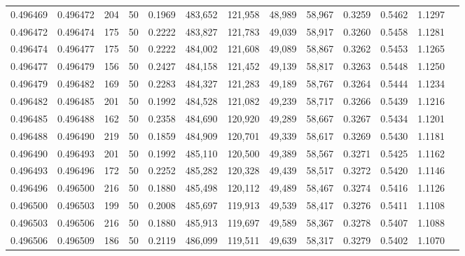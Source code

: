 \begin{tabular}{rrrrrrrrrrrrr}
0.496469 & 0.496472 &   204 &  50 &                                     0.1969 & 483,652 & 121,958 &  48,989 &  58,967 & 0.3259 & 0.5462 & 1.1297 \\
0.496472 & 0.496474 &   175 &  50 &                                     0.2222 & 483,827 & 121,783 &  49,039 &  58,917 & 0.3260 & 0.5458 & 1.1281 \\
0.496474 & 0.496477 &   175 &  50 &                                     0.2222 & 484,002 & 121,608 &  49,089 &  58,867 & 0.3262 & 0.5453 & 1.1265 \\
0.496477 & 0.496479 &   156 &  50 &                                     0.2427 & 484,158 & 121,452 &  49,139 &  58,817 & 0.3263 & 0.5448 & 1.1250 \\
0.496479 & 0.496482 &   169 &  50 &                                     0.2283 & 484,327 & 121,283 &  49,189 &  58,767 & 0.3264 & 0.5444 & 1.1234 \\
0.496482 & 0.496485 &   201 &  50 &                                     0.1992 & 484,528 & 121,082 &  49,239 &  58,717 & 0.3266 & 0.5439 & 1.1216 \\
0.496485 & 0.496488 &   162 &  50 &                                     0.2358 & 484,690 & 120,920 &  49,289 &  58,667 & 0.3267 & 0.5434 & 1.1201 \\
0.496488 & 0.496490 &   219 &  50 &                                     0.1859 & 484,909 & 120,701 &  49,339 &  58,617 & 0.3269 & 0.5430 & 1.1181 \\
0.496490 & 0.496493 &   201 &  50 &                                     0.1992 & 485,110 & 120,500 &  49,389 &  58,567 & 0.3271 & 0.5425 & 1.1162 \\
0.496493 & 0.496496 &   172 &  50 &                                     0.2252 & 485,282 & 120,328 &  49,439 &  58,517 & 0.3272 & 0.5420 & 1.1146 \\
0.496496 & 0.496500 &   216 &  50 &                                     0.1880 & 485,498 & 120,112 &  49,489 &  58,467 & 0.3274 & 0.5416 & 1.1126 \\
0.496500 & 0.496503 &   199 &  50 &                                     0.2008 & 485,697 & 119,913 &  49,539 &  58,417 & 0.3276 & 0.5411 & 1.1108 \\
0.496503 & 0.496506 &   216 &  50 &                                     0.1880 & 485,913 & 119,697 &  49,589 &  58,367 & 0.3278 & 0.5407 & 1.1088 \\
0.496506 & 0.496509 &   186 &  50 &                                     0.2119 & 486,099 & 119,511 &  49,639 &  58,317 & 0.3279 & 0.5402 & 1.1070 \\

\end{tabular}
